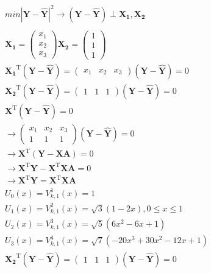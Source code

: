 \documentclass{article}
\begin{document}
\begin{equation}
\begin{aligned}
        min |\mathbf{Y}-\mathbf{\hat{Y}}|^2 \to (\mathbf{Y}-\mathbf{\hat{Y}})\perp\mathbf{X_1},\mathbf{X_2}\\
        \\
        \mathbf{X_1}=\begin{pmatrix}
            x_1\\
            x_2\\
            x_3
        \end{pmatrix}
        \mathbf{X_2}=\begin{pmatrix}
            1\\
            1\\
            1
        \end{pmatrix}\\
        \mathbf{X_1}^\mathrm{T}(\mathbf{Y}-\mathbf{\hat{Y}})=\begin{pmatrix}
            x_1&x_2&x_3
        \end{pmatrix}(\mathbf{Y}-\mathbf{\hat{Y}})=0\\
        \mathbf{X_2}^\mathrm{T}(\mathbf{Y}-\mathbf{\hat{Y}})=\begin{pmatrix}
            1&1&1
        \end{pmatrix}(\mathbf{Y}-\mathbf{\hat{Y}})=0\\
        \mathbf{X}^\mathrm{T}(\mathbf{Y}-\mathbf{\hat{Y}})=0\\
        \to \begin{pmatrix}
            x_1&x_2&x_3\\
            1&1&1
        \end{pmatrix}(\mathbf{Y}-\mathbf{\hat{Y}})=0\\
        \to \mathbf{X}^\mathrm{T}(\mathbf{Y}-\mathbf{XA})=0\\
        \to \mathbf{X}^\mathrm{T}\mathbf{Y}-\mathbf{X}^\mathrm{T}\mathbf{XA}=0\\
        \to \mathbf{X}^\mathrm{T}\mathbf{Y}=\mathbf{X}^\mathrm{T}\mathbf{XA}\\
        U_0(x)=V_{k,1}^1(x)=1\\
        U_1(x)=V_{k,1}^2(x)=\sqrt{3}(1-2x),0\leq x\leq 1\\
        U_2(x)=V_{k,1}^3(x)=\sqrt{5}(6x^2-6x+1)\\
        U_3(x)=V_{k,1}^4(x)=\sqrt{7}(-20x^3+30x^2-12x+1)\\
        \mathbf{X_2}^\mathrm{T}(\mathbf{Y}-\mathbf{\hat{Y}})=\begin{pmatrix}
            1&1&1
        \end{pmatrix}(\mathbf{Y}-\mathbf{\hat{Y}})=0\\

\end{aligned}
\end{equation}
\end{document}
